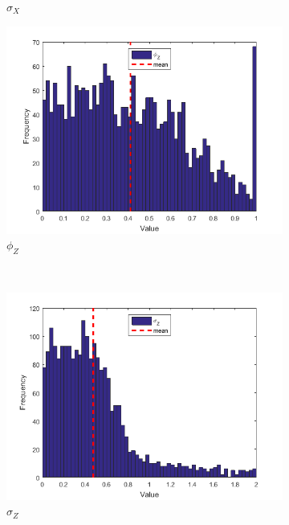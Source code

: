\documentclass[11pt,a4,twosided,singlespacing,titlepagenumber=on]{scrreprt}
\numberwithin{equation}{chapter} %
\theoremstyle{remark}
\begin{document}
\begin{figure}[H]
\begin{subfigure}[t]{0.32\textwidth}
        \caption{$\sigma_X$}
    \end{subfigure}
    \begin{subfigure}[t]{0.32\textwidth}
        \centering
        \includegraphics[width=1\textwidth]{res/params/731_1462/3}
        \caption{$\phi_Z$}
    \end{subfigure} \\
    \begin{subfigure}[t]{0.32\textwidth}
        \centering
        \includegraphics[width=1\textwidth]{res/params/731_1462/4}
        \caption{$\sigma_Z$}
    \end{subfigure}
    \begin{subfigure}[t]{0.32\textwidth}
        \centering

\end{subfigure}
\end{figure}
\end{document}
